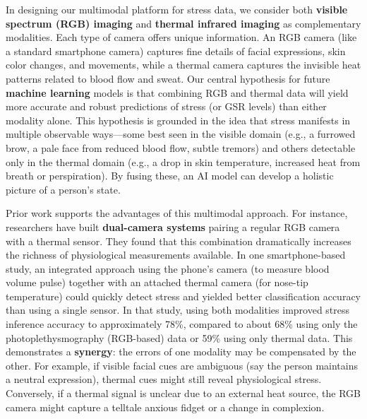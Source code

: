 \documentclass[11pt,a4paper]{report}
\begin{document}
In designing our multimodal platform for stress data, we consider both \textbf{visible spectrum (RGB) imaging} and \textbf{thermal infrared imaging} as complementary modalities. Each type of camera offers unique information. An RGB camera (like a standard smartphone camera) captures fine details of facial expressions, skin color changes, and movements, while a thermal camera captures the invisible heat patterns related to blood flow and sweat. Our central hypothesis for future \textbf{machine learning} models is that combining RGB and thermal data will yield more accurate and robust predictions of stress (or GSR levels) than either modality alone. This hypothesis is grounded in the idea that stress manifests in multiple observable ways—some best seen in the visible domain (e.g., a furrowed brow, a pale face from reduced blood flow, subtle tremors) and others detectable only in the thermal domain (e.g., a drop in skin temperature, increased heat from breath or perspiration). By fusing these, an AI model can develop a holistic picture of a person's state.

Prior work supports the advantages of this multimodal approach. For instance, researchers have built \textbf{dual-camera systems} pairing a regular RGB camera with a thermal sensor. They found that this combination dramatically increases the richness of physiological measurements available\cite{InstantStressSmartphone2019}. In one smartphone-based study, an integrated approach using the phone's camera (to measure blood volume pulse) together with an attached thermal camera (for nose-tip temperature) could quickly detect stress and yielded better classification accuracy than using a single sensor\cite{InstantStressSmartphone2019}. In that study, using both modalities improved stress inference accuracy to approximately 78\%, compared to about 68\% using only the photoplethysmography (RGB-based) data or 59\% using only thermal data\cite{InstantStressSmartphone2019}. This demonstrates a \textbf{synergy}: the errors of one modality may be compensated by the other. For example, if visible facial cues are ambiguous (say the person maintains a neutral expression), thermal cues might still reveal physiological stress. Conversely, if a thermal signal is unclear due to an external heat source, the RGB camera might capture a telltale anxious fidget or a change in complexion.
\end{document}
